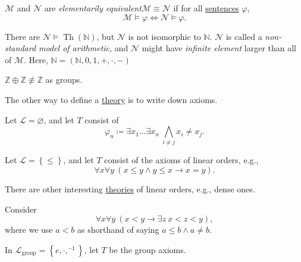 \begin{definition}\label{def:elementarily-equivalent}
	\(\mathcal{M} \) and \(\mathcal{N} \) are \emph{elementarily equivalent}\(\mathcal{M} \equiv \mathcal{N} \) if for all \hyperref[def:sentence]{sentences} \(\varphi \),
	\[
		\mathcal{M} \models \varphi \iff \mathcal{N} \models \varphi .
	\]
\end{definition}

\begin{remark}
	There are \(\mathcal{N} \models \mathop{\mathrm{Th}}(\mathbb{N})\), but \(\mathcal{N} \) is not isomorphic to \(\mathbb{N} \). \(\mathcal{N} \) is called a \emph{non-standard model of arithmetic}, and \(\mathcal{N} \) might have \emph{infinite element} larger than all of \(\mathcal{M} \). Here, \(\mathbb{N} =(\mathbb{N} , 0, 1, +, \cdot, - )\)
\end{remark}

\begin{eg}
	\(\mathbb{Z} \oplus \mathbb{Z} \not\equiv \mathbb{Z} \) as groups.
\end{eg}

The other way to define a \hyperref[def:theory]{theory} is to write down axioms.

\begin{eg}
	Let \(\mathcal{L} = \varnothing \), and let \(T\) consist of
	\[
		\varphi _n \coloneqq \exists x_1 \ldots \exists x_n\ \bigwedge _{i \neq j} x_i \neq x_j.
	\]
\end{eg}

\begin{eg}
	Let \(\mathcal{L} =\left\{ \leq \right\} \), and let \(T\) consist of the axioms of linear orders, e.g.,
	\[
		\forall x\forall y\ (x \leq y \land y \leq x \to x=y).
	\]
\end{eg}

There are other interesting \hyperref[def:theory]{theories} of linear orders, e.g., dense ones.

\begin{eg}
	Consider
	\[
		\forall x \forall y\ (x < y \to  \exists z\ x < z < y),
	\]
	where we use \(a < b\) as shorthand of saying \(a \leq b \land a \neq b\).
\end{eg}

\begin{eg}[Group]
	In \(\mathcal{L} _{\text{group} } = \left\{ e, \cdot, ^{-1}  \right\} \), let \(T\) be the group axioms.
\end{eg}

